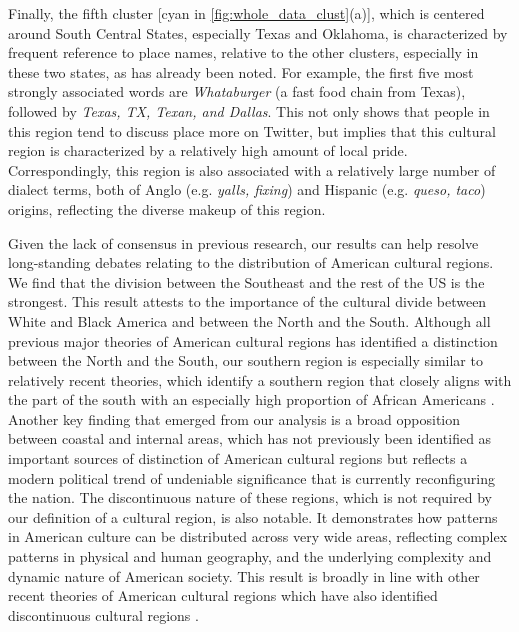 \documentclass[../thesis.tex]{subfiles}
\begin{document}
Finally, the fifth cluster [cyan in \cref{fig:whole_data_clust}(a)], which is centered
around South Central States, especially Texas and Oklahoma, is characterized by frequent
reference to place names, relative to the other clusters, especially in these two
states, as has already been noted. For example, the first five most strongly associated
words are \textit{Whataburger} (a fast food chain from Texas), followed by
\textit{Texas, TX, Texan, and Dallas}. This not only shows that people in this region
tend to discuss place more on Twitter, but implies that this cultural region is
characterized by a relatively high amount of local pride. Correspondingly, this region
is also associated with a relatively large number of dialect terms, both of Anglo (e.g.
\textit{yalls, fixing}) and Hispanic (e.g. \textit{queso, taco}) origins, reflecting the
diverse makeup of this region.

Given the lack of consensus in previous research, our results can help resolve
long-standing debates relating to the distribution of American cultural regions. We find
that the division between the Southeast and the rest of the US is the strongest. This
result attests to the importance of the cultural divide between White and Black America
and between the North and the South. Although all previous major theories of American
cultural regions has identified a distinction between the North and the South, our
southern region is especially similar to relatively recent theories, which identify a
southern region that closely aligns with the part of the south with an especially high
proportion of African Americans
\cite{LieskeRegionalSubcultures1993,WoodardAmericanNations2012}. Another key finding
that emerged from our analysis is a broad opposition between coastal and internal areas,
which has not previously been identified as important sources of distinction of American
cultural regions
\cite{OdumSouthernRegions1936,ElazarCitiesPrairie1970,ZelinskyCulturalGeography1992,GastilCulturalRegions1975,GarreauNineNations1996,FischerAlbionSeed1989,LieskeRegionalSubcultures1993,WoodardAmericanNations2012}
but reflects a modern political trend of undeniable significance
\cite{GelmanRedState2009} that is currently reconfiguring the nation. The discontinuous
nature of these regions, which is not required by our definition of a cultural region,
is also notable. It demonstrates how patterns in American culture can be distributed
across very wide areas, reflecting complex patterns in physical and human geography, and
the underlying complexity and dynamic nature of American society. This result is broadly
in line with other recent theories of American cultural regions which have also
identified discontinuous cultural regions
\cite{LieskeRegionalSubcultures1993,WoodardAmericanNations2012}.
\end{document}

